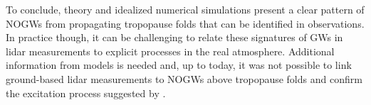 To conclude, theory and idealized numerical simulations present a clear pattern of NOGWs from propagating tropopause folds that can be identified in observations. In practice though, it can be challenging to relate these signatures of GWs in lidar measurements to explicit processes in the real atmosphere. Additional information from models is needed and, up to today, it was not possible to link ground-based lidar measurements to NOGWs above tropopause folds and confirm the excitation process suggested by \textcite[]{dornbrack_stratospheric_2022}.
